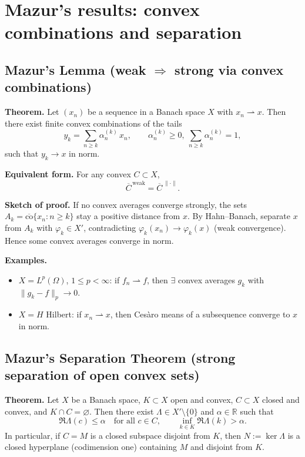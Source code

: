 \documentclass[12pt,a4paper]{article}
\theoremstyle{plain}
\theoremstyle{definition}
\theoremstyle{remark}
\theoremstyle{remark}
\theoremstyle{definition}
\begin{document}
	
	
	\section*{Mazur’s results: convex combinations and separation}
	
	\subsection*{Mazur’s Lemma (weak $\Rightarrow$ strong via convex combinations)}
	\textbf{Theorem.} Let $(x_n)$ be a sequence in a Banach space $X$ with $x_n \rightharpoonup x$.
	Then there exist finite convex combinations of the tails
	\[
	y_k=\sum_{n\ge k}\alpha^{(k)}_n\,x_n,\qquad \alpha^{(k)}_n\ge 0,\ \sum_{n\ge k}\alpha^{(k)}_n=1,
	\]
	such that $y_k \to x$ in norm.
	
	\textbf{Equivalent form.} For any convex $C\subset X$,
	\[
	\overline{C}^{\,\mathrm{weak}}=\overline{C}^{\,\|\cdot\|}.
	\]
	
	\textbf{Sketch of proof.} If no convex averages converge strongly, the sets
	$A_k=\overline{\mathrm{co}}\{x_n:n\ge k\}$ stay a positive distance from $x$.
	By Hahn–Banach, separate $x$ from $A_k$ with $\varphi_k\in X'$, contradicting
	$\varphi_k(x_n)\to\varphi_k(x)$ (weak convergence). Hence some convex averages converge in norm.
	
	\textbf{Examples.}
	\begin{itemize}
		\item $X=L^p(\Omega)$, $1\le p<\infty$: if $f_n\rightharpoonup f$, then $\exists$ convex averages $g_k$ with $\|g_k-f\|_p\to 0$.
		\item $X=H$ Hilbert: if $x_n\rightharpoonup x$, then Ces\`aro means of a subsequence converge to $x$ in norm.
	\end{itemize}
	
	\bigskip
	\subsection*{Mazur’s Separation Theorem (strong separation of open convex sets)}
	\textbf{Theorem.} Let $X$ be a Banach space, $K\subset X$ open and convex, $C\subset X$ closed and convex,
	and $K\cap C=\varnothing$. Then there exist $\Lambda\in X'\setminus\{0\}$ and $\alpha\in\mathbb R$ such that
	\[
	\Re\Lambda(c)\le \alpha \quad\text{for all } c\in C, \qquad
	\inf_{k\in K}\Re\Lambda(k)>\alpha.
	\]
	In particular, if $C=M$ is a closed subspace disjoint from $K$, then $N:=\ker\Lambda$ is a closed
	hyperplane (codimension one) containing $M$ and disjoint from $K$.
	
\end{document}
